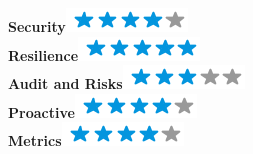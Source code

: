 \documentclass[]{friggeri-cv}
\begin{document}
\begin{flushright}
\begin{multicols}{3}
    \textbf{Security}\includegraphics[scale=0.40]{img/4stars.png}\\
    \textbf{Resilience}\includegraphics[scale=0.40]{img/5stars.png}\\
    \textbf{Audit and Risks}\includegraphics[scale=0.40]{img/3stars.png}\\
    \textbf{Proactive}\includegraphics[scale=0.40]{img/4stars.png}\\
    \textbf{Metrics}\includegraphics[scale=0.40]{img/4stars.png}\\

\end{multicols}
\end{flushright}
\end{document}
